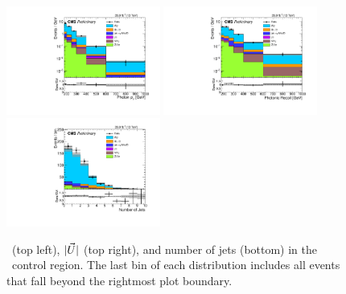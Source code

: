 \begin{figure}[htbp]
  \begin{center}
    \includegraphics[width=0.45\textwidth]{Figures/results/wmng_phoPt.pdf}
    \includegraphics[width=0.45\textwidth]{Figures/results/wmng_recoil.pdf}
    \includegraphics[width=0.45\textwidth]{Figures/results/wmng_nJet.pdf}
    \caption{
      \ETgamma\ (top left), $|\vec{U}|$ (top right), and number of jets (bottom) in the \Pmu\Pgamma\ control region.
      The last bin of each distribution includes all events that fall beyond the rightmost plot boundary.
    }
    \label{fig:monomu}
  \end{center}
\end{figure}

